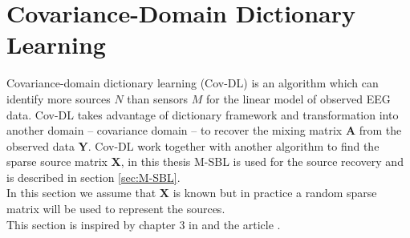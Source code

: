 \section{Covariance-Domain Dictionary Learning}\label{sec:Cov-DL}
Covariance-domain dictionary learning (Cov-DL) is an algorithm which can identify more sources $N$ than sensors $M$ for the linear model of observed EEG data.
Cov-DL takes advantage of dictionary framework and transformation into another domain -- covariance domain -- to recover the mixing matrix $\mathbf{A}$ from the observed data $\mathbf{Y}$. Cov-DL work together with another algorithm to find the sparse source matrix $\mathbf{X}$, in this thesis M-SBL is used for the source recovery and is described in section \ref{sec:M-SBL}. 
\\
In this section we assume that $\mathbf{X}$ is known but in practice a random sparse matrix will be used to represent the sources. 
\\
This section is inspired by chapter 3 in \cite{phd2015} and the article \cite{Balkan2015}.
\\ \\
